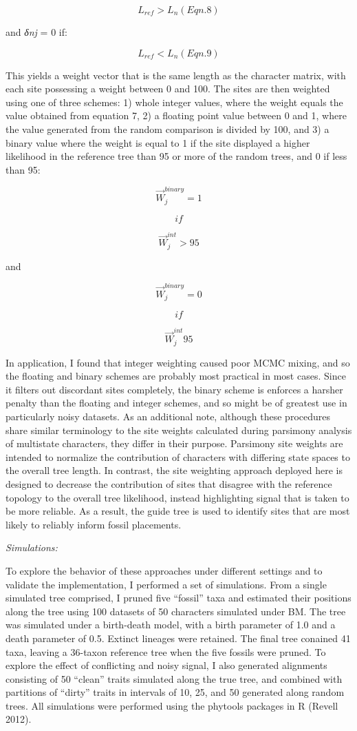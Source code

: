 \documentclass[12pt]{article}
\begin{document}
\[L_{ref} > L_n (Eqn. 8)\]

and \emph{δnj} = 0 if:

\[L_{ref} < L_n (Eqn. 9)\]

This yields a weight vector that is the same length as the character
matrix, with each site possessing a weight between 0 and 100. The sites
are then weighted using one of three schemes: 1) whole integer values,
where the weight equals the value obtained from equation 7, 2) a
floating point value between 0 and 1, where the value generated from the
random comparison is divided by 100, and 3) a binary value where the
weight is equal to 1 if the site displayed a higher likelihood in the
reference tree than 95 or more of the random trees, and 0 if less than
95:

\[\overrightarrow{W}^{binary}_j = 1\]

\[if \]

\[\overrightarrow{W}^{int}_j > 95 \]

and

\[\overrightarrow{W}^{binary}_j = 0 \]

\[if\]

\[ \overrightarrow{W}^{int}_j  95\]

In application, I found that integer weighting caused poor MCMC mixing,
and so the floating and binary schemes are probably most practical in
most cases. Since it filters out discordant sites completely, the binary
scheme is enforces a harsher penalty than the floating and integer
schemes, and so might be of greatest use in particularly noisy datasets.
As an additional note, although these procedures share similar
terminology to the site weights calculated during parsimony analysis of
multistate characters, they differ in their purpose. Parsimony site
weights are intended to normalize the contribution of characters with
differing state spaces to the overall tree length. In contrast, the site
weighting approach deployed here is designed to decrease the
contribution of sites that disagree with the reference topology to the
overall tree likelihood, instead highlighting signal that is taken to be
more reliable. As a result, the guide tree is used to identify sites
that are most likely to reliably inform fossil placements.

\emph{Simulations:}

To explore the behavior of these approaches under different settings and
to validate the implementation, I performed a set of simulations. From a
single simulated tree comprised, I pruned five ``fossil'' taxa and
estimated their positions along the tree using 100 datasets of 50
characters simulated under BM. The tree was simulated under a
birth-death model, with a birth parameter of 1.0 and a death parameter
of 0.5. Extinct lineages were retained. The final tree conained 41 taxa,
leaving a 36-taxon reference tree when the five fossils were pruned. To
explore the effect of conflicting and noisy signal, I also generated
alignments consisting of 50 ``clean'' traits simulated along the true
tree, and combined with partitions of ``dirty'' traits in intervals of
10, 25, and 50 generated along random trees. All simulations were
performed using the phytools packages in R (Revell 2012).
\end{document}
